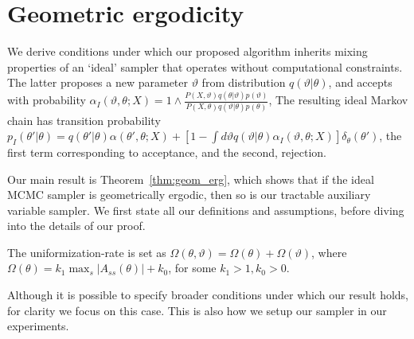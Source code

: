 \section{Geometric ergodicity}
We derive conditions under which our proposed algorithm
inherits mixing properties of an `ideal' sampler that operates without
computational constraints. The latter proposes a new parameter $\vartheta$
from distribution $q(\vartheta|\theta)$, and accepts with probability
$\alpha_I(\vartheta,\theta; X) = 1 \wedge \frac{P(X , \vartheta)q(\theta| \vartheta)p(\vartheta)}
      {P(X , \theta)q(\vartheta|\theta)p(\theta)}$,  The resulting ideal
Markov chain has transition probability
$p_I(\theta'|\theta) = q(\theta'|\theta)\alpha(\theta',\theta;X) + \left[1-\int d\vartheta
q(\vartheta|\theta)\alpha_I(\vartheta,\theta;X)\right]\delta_\theta(\theta')$, the first
term corresponding to acceptance, and the second, rejection.

Our main result is Theorem~\ref{thm:geom_erg}, which shows that if the ideal MCMC
sampler is geometrically ergodic, then so is our tractable auxiliary
variable sampler. 
We first state all our definitions and assumptions, before diving into the details
of our proof.
\begin{assumption}
The uniformization-rate is set as $\Omega(\theta, \vartheta) = \Omega(\theta) + 
\Omega(\vartheta)$, where %
$\Omega(\theta) = k_1 \max_s |A_{ss}(\theta)| + k_0$, for some 
$k_1 > 1, k_0 > 0$.
\label{asmp:unif_rate}
\end{assumption}
Although it is possible to specify broader conditions under which our 
result holds, for clarity we focus on this case. This is also how we 
setup our sampler in our experiments.

